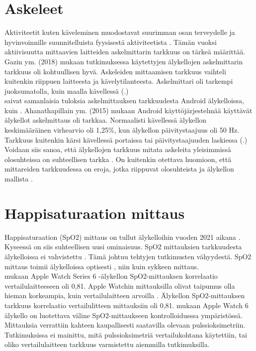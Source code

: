 \documentclass[utf8,bachelor,finnish]{bachelor}
\begin{document}
  \section{Askeleet}
  Aktiviteetit kuten käveleminen muodostavat suurimman osan terveydelle ja hyvinvoinnille suunnitelluista fyysisestä aktiviteetista \parencite{gaz_determining_2018}.
   Tämän vuoksi aktiivisuutta mittaavien laitteiden askelmittarin tarkkuus on tärkeä määrittää.
    Gazin ym. (2018) mukaan tutkimuksessa käytettyjen älykellojen askelmittarin tarkkuus oli kohtuullisen hyvä. Askeleiden mittaamisen tarkkuus
     vaihteli kuitenkin riippuen laitteesta ja kävelytilanteesta. Askelmittari oli tarkempi juoksumatolla, kuin
      maalla kävellessä (\cite{gaz_determining_2018}.)\\
  
  \textcite{ahanathapillai_preliminary_2015} saivat samanlaisia tuloksia askelmittauksen tarkkuudesta Android älykelloissa, kuin \textcite{gaz_determining_2018}.
   Ahanathapillain ym. (2015) mukaan Android käyttöjärjestelmää käyttävät älykellot askelmittaus oli tarkkaa.
    Normaalisti kävellessä älykellon keskimääräinen virhearvio oli 1,25\%, kun älykellon päivitystaajuus oli 50 Hz.
     Tarkkuus kuitenkin kärsi kävellessä portaissa tai päivitystaajuuden laskiessa (\cite{ahanathapillai_preliminary_2015}.)\\
  
  Voidaan siis sanoa, että älykellojen tarkkuus mitata askeleita yleisimmissä olosuhteissa on suhteellisen tarkka
   \parencite{gaz_determining_2018,ahanathapillai_preliminary_2015}. On kuitenkin otettava huomioon, että mittareiden
    tarkkuudessa on eroja, jotka riippuvat olosuhteista ja älykellon mallista \parencite{gaz_determining_2018}.
  

  \section{Happisaturaation mittaus}
  Happisaturaation (SpO2) mittaus on tullut älykelloihin vuoden 2021 aikana \parencite{zhang_can_2022}. Kyseessä on siis suhteellisen uusi ominaisuus.
   SpO2 mittauksien tarkkuudesta älykelloissa ei vahvistettu \parencite{zhang_can_2022}. Tämä johtuu tehtyjen tutkimusten vähyydestä.
    SpO2 mittaus toimii älykelloissa optisesti \parencite{windisch_accuracy_2023}, niin kuin sykkeen mittaus.\\
    
  \textcite{pipek_comparison_2021} mukaan Apple Watch Series 6 -älykellon SpO2-mittauksen korrelaatio vertailulaitteeseen oli 0,81.
   Apple Watchin mittauksilla olivat taipumus olla hieman korkeampia, kuin vertailulaitteen arvoilla \parencite{pipek_comparison_2021}.
    Älykellon SpO2-mittauksen tarkkuus korrelaatio vertailulitteen mittauksiin oli 0,81.
     \textcite{pipek_comparison_2021} mukaan Apple Watch 6 älykello on luotettava väline SpO2-mittaukseen kontrolloidusssa ympäristössä.
      Mittauksia verrattiin kahteen kaupallisesti saatavilla olevaan pulssioksimetriin.
       Tutkimuksissa ei mainittu, mitä pulssioksimetriä vertailukohtana käytettiin, tai oliko vertailulaitteen tarkkuus varmistettu aiemmilla tutkimuksilla.
   
\end{document}
